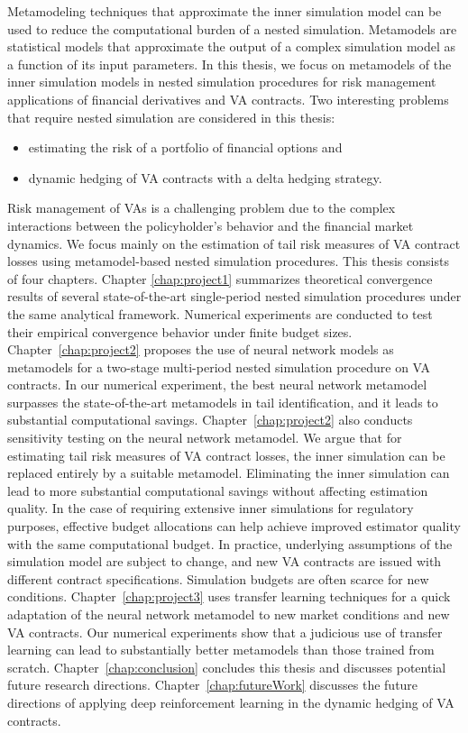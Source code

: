 Metamodeling techniques that approximate the inner simulation model can be used to reduce the computational burden of a nested simulation.
Metamodels are statistical models that approximate the output of a complex simulation model as a function of its input parameters.
In this thesis, we focus on metamodels of the inner simulation models in nested simulation procedures for risk management applications of financial derivatives and VA contracts.
Two interesting problems that require nested simulation are considered in this thesis:  
\begin{itemize}
    \item estimating the risk of a portfolio of financial options and 
    \item dynamic hedging of VA contracts with a delta hedging strategy.
\end{itemize}
Risk management of VAs is a challenging problem due to the complex interactions between the policyholder's behavior and the financial market dynamics.
We focus mainly on the estimation of tail risk measures of VA contract losses using metamodel-based nested simulation procedures.
This thesis consists of four chapters. 
Chapter \ref{chap:project1} summarizes theoretical convergence results of several state-of-the-art single-period nested simulation procedures under the same analytical framework. 
Numerical experiments are conducted to test their empirical convergence behavior under finite budget sizes.
Chapter~\ref{chap:project2} proposes the use of neural network models as metamodels for a two-stage multi-period nested simulation procedure on VA contracts. 
In our numerical experiment, the best neural network metamodel surpasses the state-of-the-art metamodels in tail identification, and it leads to substantial computational savings. 
Chapter~\ref{chap:project2} also conducts sensitivity testing on the neural network metamodel. 
We argue that for estimating tail risk measures of VA contract losses, the inner simulation can be replaced entirely by a suitable metamodel. 
Eliminating the inner simulation can lead to more substantial computational savings without affecting estimation quality. 
In the case of requiring extensive inner simulations for regulatory purposes, effective budget allocations can help achieve improved estimator quality with the same computational budget.
In practice, underlying assumptions of the simulation model are subject to change, and new VA contracts are issued with different contract specifications.
Simulation budgets are often scarce for new conditions.
Chapter~\ref{chap:project3} uses transfer learning techniques for a quick adaptation of the neural network metamodel to new market conditions and new VA contracts.
Our numerical experiments show that a judicious use of transfer learning can lead to substantially better metamodels than those trained from scratch.
Chapter~\ref{chap:conclusion} concludes this thesis and discusses potential future research directions.
Chapter~\ref{chap:futureWork} discusses the future directions of applying deep reinforcement learning in the dynamic hedging of VA contracts.

